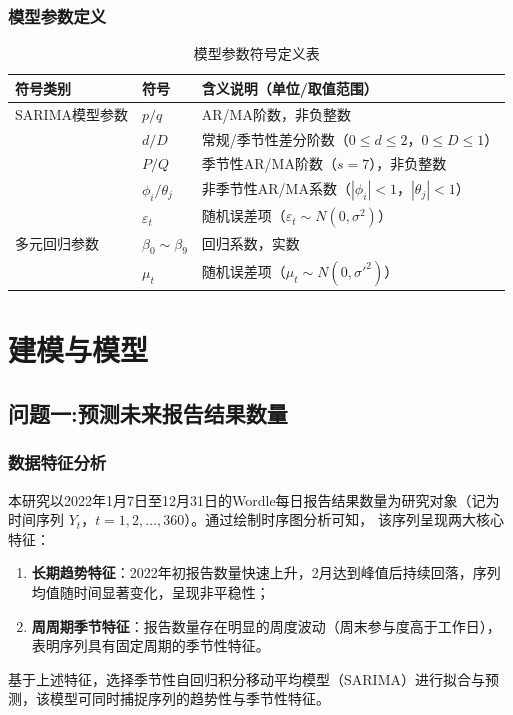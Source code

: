 \documentclass[12pt]{article}  %
\begin{document}
\subsubsection{模型参数定义}
\begin{table}[htbp]
  \centering
  \renewcommand{\arraystretch}{1.2}
  \caption{模型参数符号定义表}
  \label{tab:param_var_def}
  \begin{tabular}{@{}p{}p{}p{}@{}}
    \toprule
    符号类别 & 符号 & 含义说明（单位/取值范围） \\
    \midrule
    SARIMA模型参数 & $p/q$ & AR/MA阶数，非负整数 \\
    & $d/D$ & 常规/季节性差分阶数（$0\leq d\leq2$，$0\leq D\leq1$） \\
    & $P/Q$ & 季节性AR/MA阶数（$s=7$），非负整数 \\
    & $\phi_i/\theta_j$ & 非季节性AR/MA系数（$|\phi_i|<1$，$|\theta_j|<1$） \\
    & $\varepsilon_t$ & 随机误差项（$\varepsilon_t \sim N(0,\sigma^2)$） \\
    \midrule
    多元回归参数 & $\beta_0 \sim \beta_9$ & 回归系数，实数 \\
    & $\mu_t$ & 随机误差项（$\mu_t \sim N(0,\sigma'^2)$） \\
    \bottomrule
  \end{tabular}
\end{table}
\newpage
\section{建模与模型}
\subsection{问题一:预测未来报告结果数量}
\subsubsection{数据特征分析}
本研究以2022年1月7日至12月31日的Wordle每日报告结果数量为研究对象（记为时间序列 $Y_t$，$t=1,2,\dots,360$）。通过绘制时序图分析可知，
该序列呈现两大核心特征：
\begin{enumerate}
    \item \textbf{长期趋势特征}：2022年初报告数量快速上升，2月达到峰值后持续回落，序列均值随时间显著变化，呈现非平稳性；
    \item \textbf{周周期季节特征}：报告数量存在明显的周度波动（周末参与度高于工作日），表明序列具有固定周期的季节性特征。
\end{enumerate}
基于上述特征，选择季节性自回归积分移动平均模型（SARIMA）进行拟合与预测，该模型可同时捕捉序列的趋势性与季节性特征。
\end{document}
